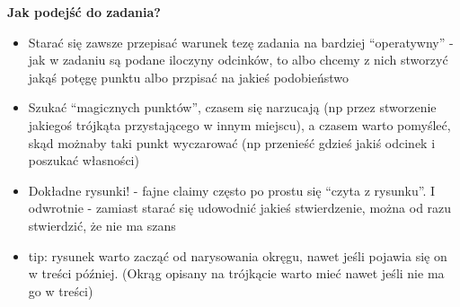 \documentclass[12pt,a4paper]{article}
\begin{document}
\begin{small}
\textbf{Jak podejść do zadania?}
\begin{itemize}
    \item Starać się zawsze przepisać warunek  tezę zadania na bardziej ``operatywny'' - jak w zadaniu są podane iloczyny odcinków, to albo chcemy z nich stworzyć jakąś potęgę punktu albo przpisać na jakieś podobieństwo
    
    \item Szukać ``magicznych punktów'', czasem się narzucają (np przez stworzenie jakiegoś trójkąta przystającego w innym miejscu), a czasem warto pomyśleć, skąd możnaby taki punkt wyczarować (np przenieść gdzieś jakiś odcinek i poszukać własności)
    
    \item Dokładne rysunki! - fajne claimy często po prostu się ``czyta z rysunku''. I odwrotnie - zamiast starać się udowodnić jakieś stwierdzenie, można od razu stwierdzić, że nie ma szans
    
    \item tip: rysunek warto zacząć od narysowania okręgu, nawet jeśli pojawia się on w treści później. (Okrąg opisany na trójkącie warto mieć nawet jeśli nie ma go w treści)
\end{itemize}
\end{small}
\end{document}
